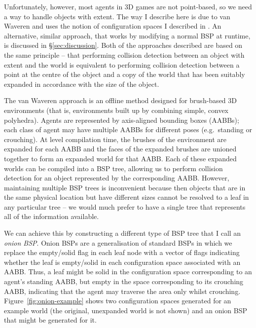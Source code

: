 \documentclass[10pt,twocolumn]{article}
\begin{document}
Unfortunately, however, most agents in 3D games are not point-based, so we need a way to handle objects with extent. The way I describe here is due to van Waveren \cite{vanwaveren01} and uses the notion of configuration spaces I described in \cite{golodetzoverload13oct}. An alternative, similar approach, that works by modifying a normal BSP at runtime, is discussed in \S\ref{sec:discussion}. Both of the approaches described are based on the same principle -- that performing collision detection between an object with extent and the world is equivalent to performing collision detection between a point at the centre of the object and a copy of the world that has been suitably expanded in accordance with the size of the object.

The van Waveren approach is an offline method designed for brush-based 3D environments (that is, environments built up by combining simple, convex polyhedra). Agents are represented by axis-aligned bounding boxes (AABBs); each class of agent may have multiple AABBs for different poses (e.g.~standing or crouching). At level compilation time, the brushes of the environment are expanded for each AABB and the faces of the expanded brushes are unioned together to form an expanded world for that AABB. Each of these expanded worlds can be compiled into a BSP tree, allowing us to perform collision detection for an object represented by the corresponding AABB. However, maintaining multiple BSP trees is inconvenient because then objects that are in the same physical location but have different sizes cannot be resolved to a leaf in any particular tree -- we would much prefer to have a single tree that represents all of the information available.

We can achieve this by constructing a different type of BSP tree that I call an \emph{onion BSP}\footnotemark{}. Onion BSPs are a generalisation of standard BSPs in which we replace the empty/solid flag in each leaf node with a vector of flags indicating whether the leaf is empty/solid in each configuration space associated with an AABB. Thus, a leaf might be solid in the configuration space corresponding to an agent's standing AABB, but empty in the space corresponding to its crouching AABB, indicating that the agent may traverse the area only whilst crouching. Figure~\ref{fig:onion-example} shows two configuration spaces generated for an example world (the original, unexpanded world is not shown) and an onion BSP that might be generated for it.

\end{document}
